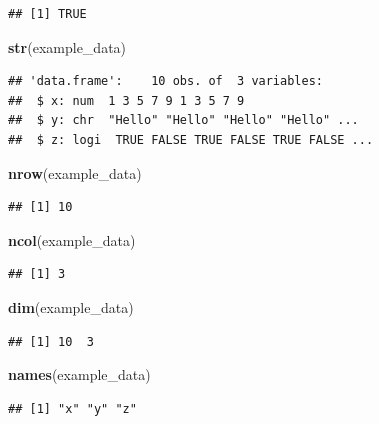 \documentclass[]{book}
\newenvironment{Shaded}{\begin{snugshade}}{\end{snugshade}}
\newcommand{\KeywordTok}[1]{\textcolor[rgb]{0.13,0.29,0.53}{\textbf{#1}}}
\newcommand{\NormalTok}[1]{#1}
\begin{document}
\begin{verbatim}
## [1] TRUE
\end{verbatim}

\begin{Shaded}
\begin{Highlighting}[]
\KeywordTok{str}\NormalTok{(example_data)}
\end{Highlighting}
\end{Shaded}

\begin{verbatim}
## 'data.frame':    10 obs. of  3 variables:
##  $ x: num  1 3 5 7 9 1 3 5 7 9
##  $ y: chr  "Hello" "Hello" "Hello" "Hello" ...
##  $ z: logi  TRUE FALSE TRUE FALSE TRUE FALSE ...
\end{verbatim}

\begin{Shaded}
\begin{Highlighting}[]
\KeywordTok{nrow}\NormalTok{(example_data)}
\end{Highlighting}
\end{Shaded}

\begin{verbatim}
## [1] 10
\end{verbatim}

\begin{Shaded}
\begin{Highlighting}[]
\KeywordTok{ncol}\NormalTok{(example_data)}
\end{Highlighting}
\end{Shaded}

\begin{verbatim}
## [1] 3
\end{verbatim}

\begin{Shaded}
\begin{Highlighting}[]
\KeywordTok{dim}\NormalTok{(example_data)}
\end{Highlighting}
\end{Shaded}

\begin{verbatim}
## [1] 10  3
\end{verbatim}

\begin{Shaded}
\begin{Highlighting}[]
\KeywordTok{names}\NormalTok{(example_data)}
\end{Highlighting}
\end{Shaded}

\begin{verbatim}
## [1] "x" "y" "z"
\end{verbatim}
\end{document}
